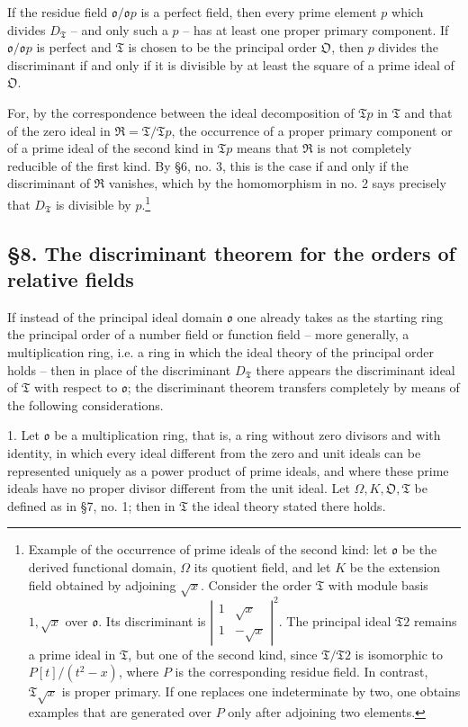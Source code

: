 \documentclass[11pt]{article}
\providecommand{\mR}{\mathfrak{R}}
\providecommand{\mT}{\mathfrak{T}}
\providecommand{\mO}{\mathfrak{O}}
\providecommand{\mo}{\mathfrak{o}}
\begin{document}
If the residue field $\mo/\mo p$ is a perfect field, then every prime element $p$ which divides $D_\mT$ -- and only such a $p$ -- has at least one proper primary component. If $\mo/\mo p$ is perfect and $\mT$ is chosen to be the principal order $\mO$, then $p$ divides the discriminant if and only if it is divisible by at least the square of a prime ideal of $\mO$.

For, by the correspondence between the ideal decomposition of $\mT p$ in $\mT$ and that of the zero ideal in $\mR=\mT/\mT p$, the occurrence of a proper primary component or of a prime ideal of the second kind in $\mT p$ means that $\mR$ is not completely reducible of the first kind. By §6, no. 3, this is the case if and only if the discriminant of $\mR$ vanishes, which by the homomorphism in no. 2 says precisely that $D_\mT$ is divisible by $p$.\footnote{Example of the occurrence of prime ideals of the second kind: let $\mo$ be the derived functional domain, $\Omega$ its quotient field, and let $K$ be the extension field obtained by adjoining $\sqrt{x}$. Consider the order $\mT$ with module basis $1,\sqrt{x}$ over $\mo$. Its discriminant is $\left|\begin{smallmatrix}1&\sqrt{x}\\1&-\sqrt{x}\end{smallmatrix}\right|^2$. The principal ideal $\mT2$ remains a prime ideal in $\mT$, but one of the second kind, since $\mT/\mT2$ is isomorphic to $P[t]/(t^2-x)$, where $P$ is the corresponding residue field. In contrast, $\mT\sqrt{x}$ is proper primary. If one replaces one indeterminate by two, one obtains examples that are generated over $P$ only after adjoining two elements.}

\subsection*{§8. The discriminant theorem for the orders of relative fields}

If instead of the principal ideal domain $\mo$ one already takes as the starting ring the principal order of a number field or function field -- more generally, a multiplication ring, i.e. a ring in which the ideal theory of the principal order holds -- then in place of the discriminant $D_\mT$ there appears the discriminant ideal of $\mT$ with respect to $\mo$; the discriminant theorem transfers completely by means of the following considerations.

1. Let $\mo$ be a multiplication ring, that is, a ring without zero divisors and with identity, in which every ideal different from the zero and unit ideals can be represented uniquely as a power product of prime ideals, and where these prime ideals have no proper divisor different from the unit ideal. Let $\Omega,K,\mO,\mT$ be defined as in §7, no. 1; then in $\mT$ the ideal theory stated there holds.
\end{document}

